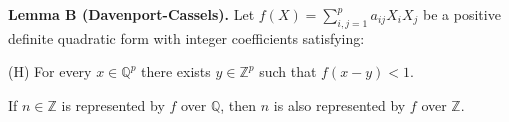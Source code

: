 \textbf{Lemma B (Davenport-Cassels).} Let $f(X) = \sum_{i,j=1}^p a_{ij} X_i X_j$ be a positive definite quadratic form with integer coefficients satisfying:
\begin{center}
(H) For every $x \in \mathbb{Q}^p$ there exists $y \in \mathbb{Z}^p$ such that $f(x-y) < 1$.
\end{center}
If $n \in \mathbb{Z}$ is represented by $f$ over $\mathbb{Q}$, then $n$ is also represented by $f$ over $\mathbb{Z}$.
